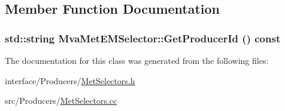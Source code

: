 \subsection{Member Function Documentation}
\hypertarget{classMvaMetEMSelector_a5cc05332a063abfbddcc26fc6754a379}{
\subsubsection[{GetProducerId}]{\setlength{\rightskip}{0pt plus 5cm}std::string MvaMetEMSelector::GetProducerId () const}}
\label{classMvaMetEMSelector_a5cc05332a063abfbddcc26fc6754a379}


The documentation for this class was generated from the following files:\begin{DoxyCompactItemize}
\item 
interface/Producers/\hyperlink{MetSelectors_8h}{MetSelectors.h}\item 
src/Producers/\hyperlink{MetSelectors_8cc}{MetSelectors.cc}\end{DoxyCompactItemize}
